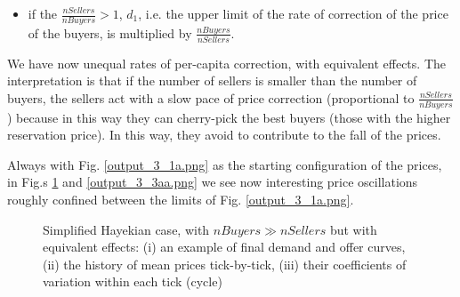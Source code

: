 \documentclass[10pt]{report}
\begin{document}
\begin{appendices}
\begin{itemize}
\item if the $\frac{nSellers}{nBuyers}>1$, $d_1$, i.e. the upper limit of the rate of correction of the price of the buyers, is multiplied by $\frac{nBuyers}{nSellers}$.

\end{itemize}

We have now unequal rates of per-capita correction, with equivalent effects. The interpretation is that if the number of sellers is smaller than the number of buyers, the sellers act with a slow pace of price correction (proportional to $\frac{nSellers}{nBuyers}$) because in this way they can cherry-pick the best buyers (those with the higher reservation price). In this way, they avoid to contribute to the fall of the prices.

Always with Fig. \ref{output_3_1a.png} as the starting configuration of the prices, in Fig.s \ref{output_3_2aa.png} and \ref{output_3_3aa.png} we see now interesting price oscillations roughly confined between the limits of Fig. \ref{output_3_1a.png}. 


\begin{figure}[H]
\begin{center}
\caption{Simplified Hayekian case, with $nBuyers \gg nSellers$ but with equivalent effects: (i) an example of final demand and offer curves, (ii) the history of mean prices tick-by-tick, (iii) their coefficients of variation within each tick (cycle)}
\label{output_3_2aa.png}
\end{center}
\end{figure}


\end{appendices}
\end{document}
